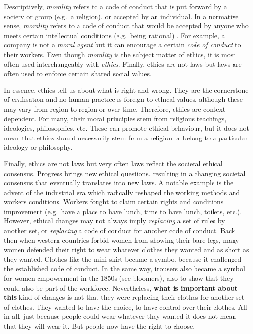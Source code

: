 \documentclass[
  12pt,
]{book}
\begin{document}
Descriptively, \emph{morality} refers to a code of conduct that is put forward by a society or group (e.g.~a religion), or accepted by an individual. In a normative sense, \emph{morality} refers to a code of conduct that would be accepted by anyone who meets certain intellectual conditions (e.g.~being rational) \citep{sep-morality-definition}. For example, a company is not a \emph{moral agent} but it can encourage a certain \emph{code of conduct} to their workers. Even though \emph{morality} is the subject matter of ethics, it is most often used interchangeably with \emph{ethics}. Finally, ethics are not laws but laws are often used to enforce certain shared social values.

In essence, ethics tell us about what is right and wrong. They are the cornerstone of civilisation and no human practice is foreign to ethical values, although these may vary from region to region or over time. Therefore, ethics are context dependent. For many, their moral principles stem from religious teachings, ideologies, philosophies, etc. These can promote ethical behaviour, but it does not mean that ethics should necessarily stem from a religion or belong to a particular ideology or philosophy.

Finally, ethics are not laws but very often laws reflect the societal ethical consensus. Progress brings new ethical questions, resulting in a changing societal consensus that eventually translates into new laws. A notable example is the advent of the industrial era which radically reshaped the working methods and workers conditions. Workers fought to claim certain rights and conditions improvement (e.g.~have a place to have lunch, time to have lunch, toilets, etc.). However, ethical changes may not always imply \emph{replacing} a set of rules by another set, or \emph{replacing} a code of conduct for another code of conduct. Back then when western countries forbid women from showing their bare legs, many women defended their right to wear whatever clothes they wanted and as short as they wanted. Clothes like the mini-skirt became a symbol because it challenged the established code of conduct. In the same way, trousers also became a symbol for women empowerment in the 1850s (see bloomers), also to show that they could also be part of the workforce. Nevertheless, \textbf{what is important about this} kind of changes is not that they were replacing their clothes for another set of clothes. They wanted to have the choice, to have control over their clothes. All in all, just because people could wear whatever they wanted it does not mean that they will wear it. But people now have the right to choose.
\end{document}
